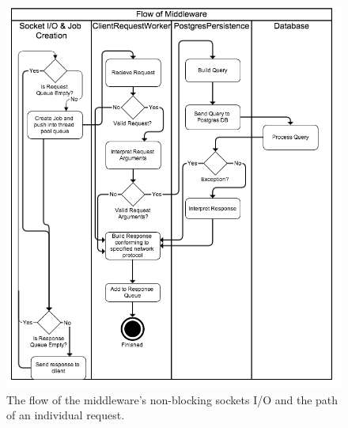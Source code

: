 \documentclass{article}
\begin{document}
   \begin{figure}[H]
                \centering
                \centerline{\includegraphics[scale=0.50]{middleware_flow}}
                \caption{The flow of the middleware's non-blocking sockets I/O and the path of an individual request.}
                \label{fig:middleware_flow}
            \end{figure}
\end{document}
